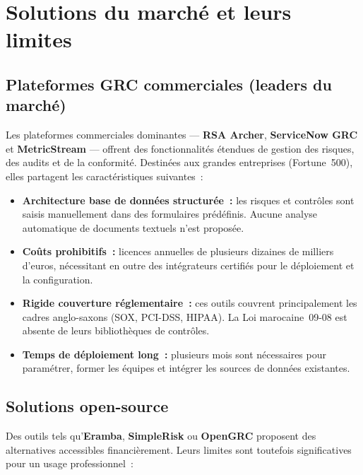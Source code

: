 \documentclass[a4paper,12pt,oneside]{report}
\begin{document}
	\section{Solutions du march\'e et leurs limites}
	
	\subsection{Plateformes GRC commerciales (leaders du march\'e)}
	
	Les plateformes commerciales dominantes --- \textbf{RSA Archer},
	\textbf{ServiceNow GRC} et \textbf{MetricStream} --- offrent des fonctionnalit\'es
	\'etendues de gestion des risques, des audits et de la conformit\'e.
	Destin\'ees aux grandes entreprises (Fortune~500), elles partagent les
	caract\'eristiques suivantes~:
	
	\begin{itemize}[leftmargin=1.5em,itemsep=4pt]
		\item \textbf{Architecture base de donn\'ees structur\'ee~:} les risques et
		contr\^oles sont saisis manuellement dans des formulaires pr\'ed\'efinis.
		Aucune analyse automatique de documents textuels n'est propos\'ee.
		\item \textbf{Co\^uts prohibitifs~:} licences annuelles de plusieurs dizaines
		de milliers d'euros, n\'ecessitant en outre des int\'egrateurs certifi\'es
		pour le d\'eploiement et la configuration.
		\item \textbf{Rigide couverture r\'eglementaire~:} ces outils couvrent principalement
		les cadres anglo-saxons (SOX, PCI-DSS, HIPAA). La Loi marocaine~09-08 est
		absente de leurs biblioth\`eques de contr\^oles.
		\item \textbf{Temps de d\'eploiement long~:} plusieurs mois sont n\'ecessaires
		pour param\'etrer, former les \'equipes et int\'egrer les sources de donn\'ees
		existantes.
	\end{itemize}
	
	\subsection{Solutions open-source}
	
	Des outils tels qu'\textbf{Eramba}, \textbf{SimpleRisk} ou \textbf{OpenGRC}
	proposent des alternatives accessibles financi\`erement. Leurs limites sont
	toutefois significatives pour un usage professionnel~:
	
\end{document}
